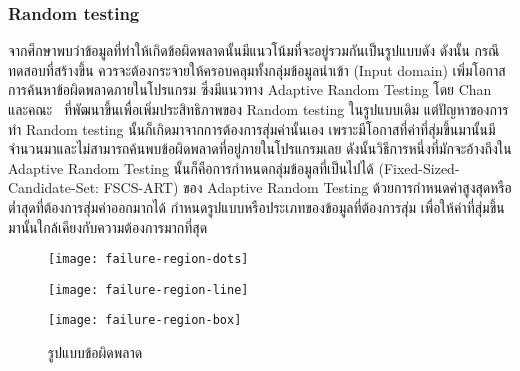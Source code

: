 \clearpage
\subsubsection{Random testing}

จากศึกษาพบว่าข้อมูลที่ทำให้เกิดข้อผิดพลาดนั้นมีแนวโน้มที่จะอยู่รวมกันเป็นรูปแบบดัง{} ดังนั้น กรณีทดสอบที่สร้างขึ้น
ควรจะต้องกระจายให้ครอบคลุมทั้งกลุ่มข้อมูลนำเข้า (Input domain) เพิ่มโอกาสการค้นหาข้อผิดพลาดภายในโปรแกรม ซึ่งมีแนวทาง Adaptive Random Testing
โดย Chan และคณะ \cite{Chan2004}\ ที่พัฒนาขึ้นเพื่อเพิ่มประสิทธิภาพของ Random testing ในรูปแบบเดิม แต่ปัญหาของการทำ Random testing
นั้นก็เกิดมาจากการต้องการสุ่มค่านั้นเอง เพราะมีโอกาสที่ค่าที่สุ่มขึ้นมานั้นมีจำนวนมาและไม่สามารถค้นพบข้อผิดพลาดที่อยู่ภายในโปรแกรมเลย 
ดังนั้นวิธีการหนึ่งที่มักจะอ้างถึงใน Adaptive Random Testing นั้นก็คือการกำหนดกลุ่มข้อมูลที่เป็นไปได้ (Fixed-Sized-Candidate-Set: FSCS-ART) 
ของ Adaptive Random Testing ด้วยการกำหนดค่าสูงสุดหรือต่ำสุดที่ต้องการสุ่มค่าออกมากได้ กำหนดรูปแบบหรือประเภทของข้อมูลที่ต้องการสุ่ม 
เพื่อให้ค่าที่สุ่มขึ้นมานั้นใกล้เคียงกับความต้องการมากที่สุด

\begin{figure}[ht!]
    \begin{minipage}[t]{0.3\linewidth}
        \centering
        \texttt{[image: failure-region-dots]}
        \label{fig:subFailureDotPattern}
    \end{minipage}
    \begin{minipage}[t]{0.3\linewidth}
        \centering
        \texttt{[image: failure-region-line]}
        \label{fig:subFailureStripPattern}
    \end{minipage}
    \begin{minipage}[t]{0.3\linewidth}
        \centering
        \texttt{[image: failure-region-box]}
        \label{fig:subFailureBoxPattern}
    \end{minipage}
    \caption{รูปแบบข้อผิดพลาด \cite{Chan2004}}
    \label{fig:failureRegionPattern}
\end{figure}
